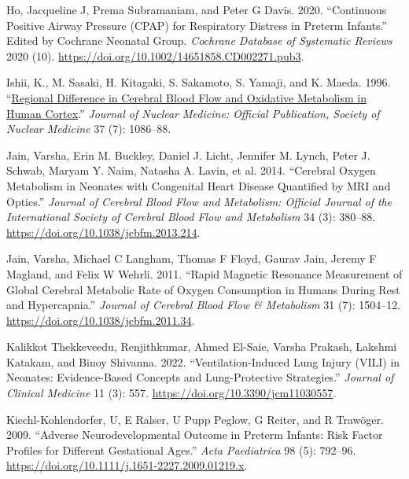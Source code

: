 \documentclass[
  letterpaper,
  DIV=11,
  numbers=noendperiod]{scrartcl}
\newlength{\cslhangindent}
\newenvironment{CSLReferences}[2] %
 {\begin{list}{}{%
  \setlength{\itemindent}{0pt}
  \setlength{\leftmargin}{0pt}
  \setlength{\parsep}{0pt}
  \ifodd #1
   \setlength{\leftmargin}{\cslhangindent}
   \setlength{\itemindent}{-1\cslhangindent}
  \fi
  \setlength{\itemsep}{#2\baselineskip}}}
 {\end{list}}
\begin{document}
\begin{CSLReferences}{1}{0}
Ho, Jacqueline J, Prema Subramaniam, and Peter G Davis. 2020.
{``Continuous Positive Airway Pressure ({CPAP}) for Respiratory Distress
in Preterm Infants.''} Edited by Cochrane Neonatal Group. \emph{Cochrane
Database of Systematic Reviews} 2020 (10).
\url{https://doi.org/10.1002/14651858.CD002271.pub3}.

Ishii, K., M. Sasaki, H. Kitagaki, S. Sakamoto, S. Yamaji, and K. Maeda.
1996. {``\href{https://www.ncbi.nlm.nih.gov/pubmed/8965174}{Regional
Difference in Cerebral Blood Flow and Oxidative Metabolism in Human
Cortex}.''} \emph{Journal of Nuclear Medicine: Official Publication,
Society of Nuclear Medicine} 37 (7): 1086--88.

Jain, Varsha, Erin M. Buckley, Daniel J. Licht, Jennifer M. Lynch, Peter
J. Schwab, Maryam Y. Naim, Natasha A. Lavin, et al. 2014. {``Cerebral
Oxygen Metabolism in Neonates with Congenital Heart Disease Quantified
by {MRI} and Optics.''} \emph{Journal of Cerebral Blood Flow and
Metabolism: Official Journal of the International Society of Cerebral
Blood Flow and Metabolism} 34 (3): 380--88.
\url{https://doi.org/10.1038/jcbfm.2013.214}.

Jain, Varsha, Michael C Langham, Thomas F Floyd, Gaurav Jain, Jeremy F
Magland, and Felix W Wehrli. 2011. {``Rapid Magnetic Resonance
Measurement of Global Cerebral Metabolic Rate of Oxygen Consumption in
Humans During Rest and Hypercapnia.''} \emph{Journal of Cerebral Blood
Flow \& Metabolism} 31 (7): 1504--12.
\url{https://doi.org/10.1038/jcbfm.2011.34}.

Kalikkot Thekkeveedu, Renjithkumar, Ahmed El-Saie, Varsha Prakash,
Lakshmi Katakam, and Binoy Shivanna. 2022. {``Ventilation-{Induced Lung
Injury} ({VILI}) in {Neonates}: {Evidence-Based Concepts} and
{Lung-Protective Strategies}.''} \emph{Journal of Clinical Medicine} 11
(3): 557. \url{https://doi.org/10.3390/jcm11030557}.

Kiechl-Kohlendorfer, U, E Ralser, U Pupp Peglow, G Reiter, and R
Trawöger. 2009. {``Adverse Neurodevelopmental Outcome in Preterm
Infants: Risk Factor Profiles for Different Gestational Ages.''}
\emph{Acta Paediatrica} 98 (5): 792--96.
\url{https://doi.org/10.1111/j.1651-2227.2009.01219.x}.


\end{CSLReferences}
\end{document}
